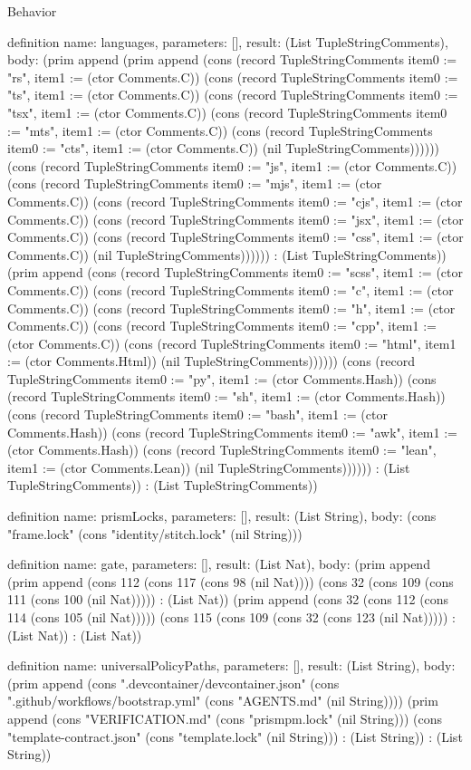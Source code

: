 \begin{lexlean}{Behavior}
\begin{semanticmodule}
definition{
  name: languages,
  parameters: [],
  result: (List TupleStringComments),
  body: (prim append (prim append (cons (record TupleStringComments {item0 := "rs", item1 := (ctor Comments.C)}) (cons (record TupleStringComments {item0 := "ts", item1 := (ctor Comments.C)}) (cons (record TupleStringComments {item0 := "tsx", item1 := (ctor Comments.C)}) (cons (record TupleStringComments {item0 := "mts", item1 := (ctor Comments.C)}) (cons (record TupleStringComments {item0 := "cts", item1 := (ctor Comments.C)}) (nil TupleStringComments)))))) (cons (record TupleStringComments {item0 := "js", item1 := (ctor Comments.C)}) (cons (record TupleStringComments {item0 := "mjs", item1 := (ctor Comments.C)}) (cons (record TupleStringComments {item0 := "cjs", item1 := (ctor Comments.C)}) (cons (record TupleStringComments {item0 := "jsx", item1 := (ctor Comments.C)}) (cons (record TupleStringComments {item0 := "css", item1 := (ctor Comments.C)}) (nil TupleStringComments)))))) : (List TupleStringComments)) (prim append (cons (record TupleStringComments {item0 := "scss", item1 := (ctor Comments.C)}) (cons (record TupleStringComments {item0 := "c", item1 := (ctor Comments.C)}) (cons (record TupleStringComments {item0 := "h", item1 := (ctor Comments.C)}) (cons (record TupleStringComments {item0 := "cpp", item1 := (ctor Comments.C)}) (cons (record TupleStringComments {item0 := "html", item1 := (ctor Comments.Html)}) (nil TupleStringComments)))))) (cons (record TupleStringComments {item0 := "py", item1 := (ctor Comments.Hash)}) (cons (record TupleStringComments {item0 := "sh", item1 := (ctor Comments.Hash)}) (cons (record TupleStringComments {item0 := "bash", item1 := (ctor Comments.Hash)}) (cons (record TupleStringComments {item0 := "awk", item1 := (ctor Comments.Hash)}) (cons (record TupleStringComments {item0 := "lean", item1 := (ctor Comments.Lean)}) (nil TupleStringComments)))))) : (List TupleStringComments)) : (List TupleStringComments))
}

definition{
  name: prismLocks,
  parameters: [],
  result: (List String),
  body: (cons "frame.lock" (cons "identity/stitch.lock" (nil String)))
}

definition{
  name: gate,
  parameters: [],
  result: (List Nat),
  body: (prim append (prim append (cons 112 (cons 117 (cons 98 (nil Nat)))) (cons 32 (cons 109 (cons 111 (cons 100 (nil Nat))))) : (List Nat)) (prim append (cons 32 (cons 112 (cons 114 (cons 105 (nil Nat))))) (cons 115 (cons 109 (cons 32 (cons 123 (nil Nat))))) : (List Nat)) : (List Nat))
}

definition{
  name: universalPolicyPaths,
  parameters: [],
  result: (List String),
  body: (prim append (cons ".devcontainer/devcontainer.json" (cons ".github/workflows/bootstrap.yml" (cons "AGENTS.md" (nil String)))) (prim append (cons "VERIFICATION.md" (cons "prismpm.lock" (nil String))) (cons "template-contract.json" (cons "template.lock" (nil String))) : (List String)) : (List String))
}


\end{semanticmodule}
\end{lexlean}
